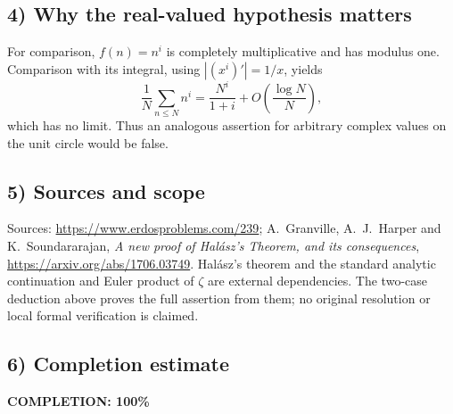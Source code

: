 \subsection{4) Why the real-valued hypothesis matters}
For comparison, $f(n)=n^i$ is completely multiplicative and has
modulus one. Comparison with its integral, using
$|(x^i)'|=1/x$, yields
\[
 \frac1N\sum_{n\leq N}n^i
       =\frac{N^i}{1+i}+O\left(\frac{\log N}{N}\right),
\]
which has no limit. Thus an analogous assertion for arbitrary
complex values on the unit circle would be false.

\subsection{5) Sources and scope}
Sources: \url{https://www.erdosproblems.com/239};
A.~Granville, A.~J.~Harper and K.~Soundararajan,
\emph{A new proof of Hal\'asz's Theorem, and its consequences},
\url{https://arxiv.org/abs/1706.03749}.
Hal\'asz's theorem and the standard analytic continuation and
Euler product of $\zeta$ are external dependencies. The two-case
deduction above proves the full assertion from them; no original
resolution or local formal verification is claimed.
\subsection{6) Completion estimate}
\textbf{COMPLETION: 100\%}
